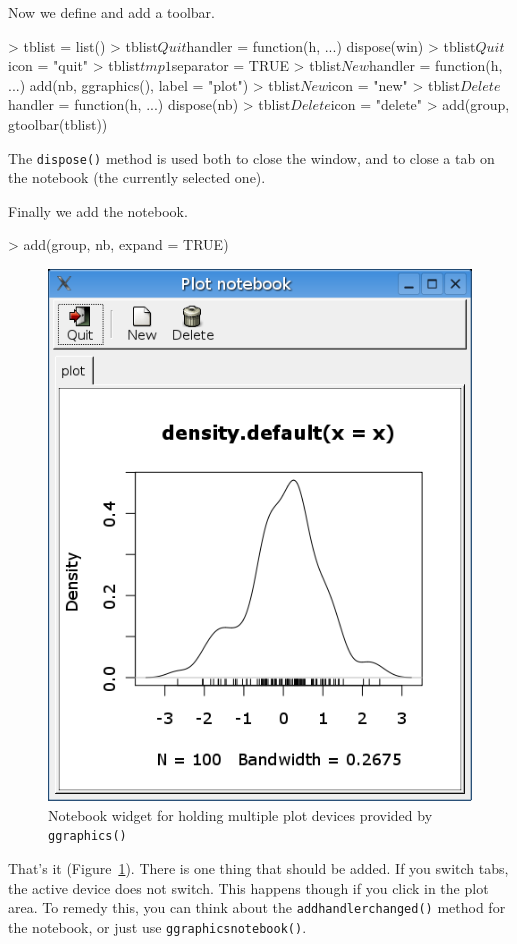 \documentclass[12pt]{article}
\newcommand{\RFunc}[1]{\texttt{#1()}}
\begin{document}
Now we define and add a toolbar.
\begin{Schunk}
\begin{Sinput}
> tblist = list()
> tblist$Quit$handler = function(h, ...) dispose(win)
> tblist$Quit$icon = "quit"
> tblist$tmp1$separator = TRUE
> tblist$New$handler = function(h, ...) add(nb, ggraphics(), label = "plot")
> tblist$New$icon = "new"
> tblist$Delete$handler = function(h, ...) dispose(nb)
> tblist$Delete$icon = "delete"
> add(group, gtoolbar(tblist))
\end{Sinput}
\end{Schunk}
The \RFunc{dispose} method is used both to close the window, and to close
a tab on the notebook (the currently selected one).

Finally we add the notebook.
\begin{Schunk}
\begin{Sinput}
> add(group, nb, expand = TRUE)
\end{Sinput}
\end{Schunk}

\begin{figure}[htbp]
  \centering
  \includegraphics[width=.6\textwidth]{notebook}
  \caption{Notebook widget for holding multiple plot devices provided by \RFunc{ggraphics}}
  \label{fig:notebook}
\end{figure}

That's it (Figure~\ref{fig:notebook}). There is one thing that should
be added. If you switch tabs, the active device does not switch. This
happens though if you click in the plot area. To remedy this, you can
think about the \RFunc{addhandlerchanged} method for the notebook, or
just use \RFunc{ggraphicsnotebook}.
\end{document}
